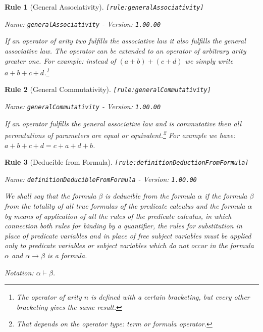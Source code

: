 \documentclass[a4paper,german,10pt,twoside]{book}
\newtheorem{rul}{Rule}
\theoremstyle{definition}
\theoremstyle{remark}
\begin{document}
\begin{rul}[General Associativity]
\label{rule:generalAssociativity} \hypertarget{rule:generalAssociativity}{}
{\tt \tiny [\verb]rule:generalAssociativity]]}

\par
{\em   Name: \verb]generalAssociativity]  -  Version: \verb]1.00.00]}


If an operator of arity two fulfills the associative law it also fulfills the general associative law. The operator can be extended to an operator of arbitrary arity greater one. For example: instead of $(a + b) + (c + d)$ we simply write $a + b + c + d$.\footnote{The operator of arity $n$ is defined with a certain bracketing, but every other bracketing gives the same result.}
\end{rul}


\begin{rul}[General Commutativity]
\label{rule:generalCommutativity} \hypertarget{rule:generalCommutativity}{}
{\tt \tiny [\verb]rule:generalCommutativity]]}

\par
{\em   Name: \verb]generalCommutativity]  -  Version: \verb]1.00.00]}


If an operator fulfills the general associative law and is commutative then all permutations of parameters are equal or equivalent.\footnote{That depends on the operator type: term or formula operator.} For example we have: $a + b + c + d  = c + a + d + b$.
\end{rul}


\begin{rul}[Deducible from Formula]
\label{rule:definitionDeductionFromFormula} \hypertarget{rule:definitionDeductionFromFormula}{}
{\tt \tiny [\verb]rule:definitionDeductionFromFormula]]}

\par
{\em   Name: \verb]definitionDeducibleFromFormula]  -  Version: \verb]1.00.00]}


We shall say that the formula $\beta$ is \emph{deducible from the formula $\alpha$} if the formula $\beta$ from the totality of all true formulas of the predicate calculus and the formula $\alpha$ by means of application of all the rules of the predicate calculus, in which connection both rules for binding by a quantifier, the rules for substitution in place of predicate variables and in place of free subject variables must be applied only to predicate variables or subject variables which do not occur in the formula $\alpha$ and $\alpha \rightarrow \beta$ is a formula. 

\par
Notation: $\alpha \vdash \beta$.
\end{rul}
\end{document}
